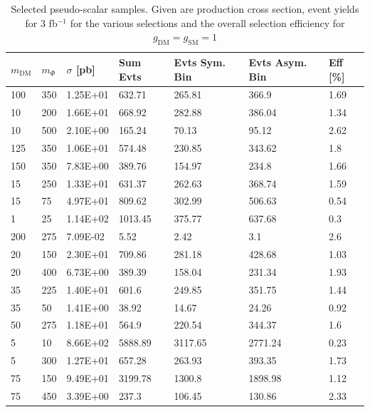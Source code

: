 \begin{table}[h]
\centering
\begin{tabular}{lllllll}
\hline
$m_\textrm{DM}$ & $m_\Phi$             & $\sigma$ [pb] & Sum Evts       & Evts Sym. Bin & Evts Asym. Bin & Eff  [\%]   \\\hline
100   &  350 & 1.25E+01 & 632.71  & 265.81  & 366.9   & 1.69 \\
10   &  200  & 1.66E+01 & 668.92  & 282.88  & 386.04  & 1.34 \\
10   &  500  & 2.10E+00 & 165.24  & 70.13   & 95.12   & 2.62 \\
125   &  350 & 1.06E+01 & 574.48  & 230.85  & 343.62  & 1.8  \\
150   &  350 & 7.83E+00 & 389.76  & 154.97  & 234.8   & 1.66 \\
15   &  250  & 1.33E+01 & 631.37  & 262.63  & 368.74  & 1.59 \\
15   &  75   & 4.97E+01 & 809.62  & 302.99  & 506.63  & 0.54 \\
1   &  25    & 1.14E+02 & 1013.45 & 375.77  & 637.68  & 0.3  \\
200   &  275 & 7.09E-02 & 5.52    & 2.42    & 3.1     & 2.6  \\
20   &  150  & 2.30E+01 & 709.86  & 281.18  & 428.68  & 1.03 \\
20   &  400  & 6.73E+00 & 389.39  & 158.04  & 231.34  & 1.93 \\
35   &  225  & 1.40E+01 & 601.6   & 249.85  & 351.75  & 1.44 \\
35   &  50   & 1.41E+00 & 38.92   & 14.67   & 24.26   & 0.92 \\
50   &  275  & 1.18E+01 & 564.9   & 220.54  & 344.37  & 1.6  \\
5   &  10    & 8.66E+02 & 5888.89 & 3117.65 & 2771.24 & 0.23 \\
5   &  300   & 1.27E+01 & 657.28  & 263.93  & 393.35  & 1.73 \\
75   &  150  & 9.49E+01 & 3199.78 & 1300.8  & 1898.98 & 1.12 \\
75   &  450  & 3.39E+00 & 237.3   & 106.45  & 130.86  & 2.33 \\
\hline
\end{tabular}
\caption{Selected pseudo-scalar samples. Given are production cross section, event yields for 3 fb$^{-1 }$ for the various selections and the overall selection efficiency for $g_\textrm{DM}=g_\textrm{SM}=1$}
\label{tab:dm_P_g1_3fb}
\end{table}




